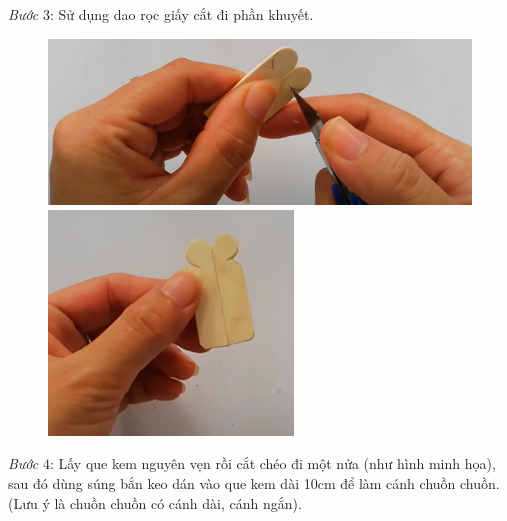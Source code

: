 \begin{multicols}{2}
\begin{figure}[H]
		\vspace*{-10pt}
	\end{figure}
	\textit{Bước} $3$: Sử dụng dao rọc giấy cắt đi phần khuyết.
	\begin{figure}[H]
		\vspace*{-5pt}
		\centering
		\captionsetup{labelformat= empty, justification=centering}
		\includegraphics[width= 1\linewidth]{18}
		\includegraphics[width= 1\linewidth]{19}
		\vspace*{-10pt}
	\end{figure}
	\textit{Bước} $4$: Lấy que kem nguyên vẹn rồi cắt chéo đi một nửa (như hình minh họa), sau đó dùng súng bắn keo dán vào que kem dài 10cm để làm cánh chuồn chuồn. (Lưu ý là chuồn chuồn có cánh dài, cánh ngắn).
	\begin{figure}[H]
		\vspace*{-5pt}
		\centering
		\captionsetup{labelformat= empty, justification=centering}

\end{figure}
\end{multicols}
